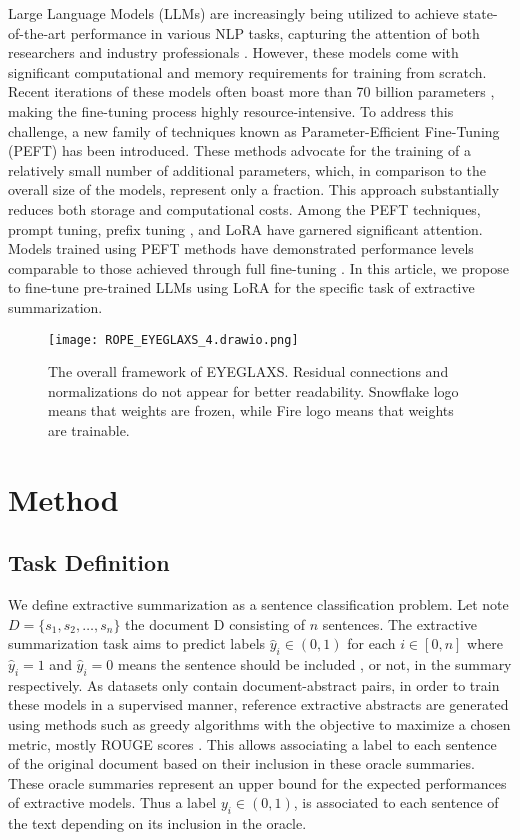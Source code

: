 Large Language Models (LLMs) are increasingly being utilized to achieve state-of-the-art performance in various NLP tasks, capturing the attention of both researchers and industry professionals \cite{bubeck2023sparks}. However, these models come with significant computational and memory requirements for training from scratch. Recent iterations of these models often boast more than 70 billion parameters \cite{touvron2023llama,zeng2022glm}, making the fine-tuning process highly resource-intensive.
To address this challenge, a new family of techniques known as Parameter-Efficient Fine-Tuning (PEFT)\cite{lialin2023scaling} has been introduced. These methods advocate for the training of a relatively small number of additional parameters, which, in comparison to the overall size of the models, represent only a fraction. This approach substantially reduces both storage and computational costs. Among the PEFT techniques, prompt tuning, prefix tuning \cite{liu-etal-2022-ptuning}, and LoRA \cite{hu2022LoRA} have garnered significant attention. Models trained using PEFT methods have demonstrated performance levels comparable to those achieved through full fine-tuning \cite{lialin2023scaling}. 
In this article, we propose to fine-tune pre-trained LLMs using LoRA for the specific task of extractive summarization.

\begin{figure}
    \centering
    \texttt{[image: ROPE\_EYEGLAXS\_4.drawio.png]}
    \caption{The overall framework of EYEGLAXS. Residual connections and normalizations do not appear for better readability. Snowflake logo means that weights are frozen, while Fire logo means that weights are trainable.}
    \label{fig:fig1}
\end{figure}

\section{Method}

\subsection{Task Definition}

We define extractive summarization as a sentence classification problem. Let note $D = \{s_1,s_2, \dots,s_n\}$ the document D consisting of $n$ sentences. The extractive summarization task aims to predict labels $\hat{y}_i \in (0,1)$ for each \( i \in [0, n] \) where $\hat{y}_i=1$ and $\hat{y}_i=0$ means the sentence should be included , or not, in the summary respectively. As datasets only contain document-abstract pairs, in order to train these models in a supervised manner, reference extractive abstracts are generated using methods such as greedy algorithms with the objective to maximize a chosen metric, mostly ROUGE scores \cite{kedzie-etal-2018-content,lin-2004-rouge}. This allows associating a label to each sentence of the original document based on their inclusion in these oracle summaries.
These oracle summaries represent an upper bound for the expected performances of extractive models. Thus a label $y_i\in (0,1)$, is associated to each sentence of the text depending on its inclusion in the oracle. 

